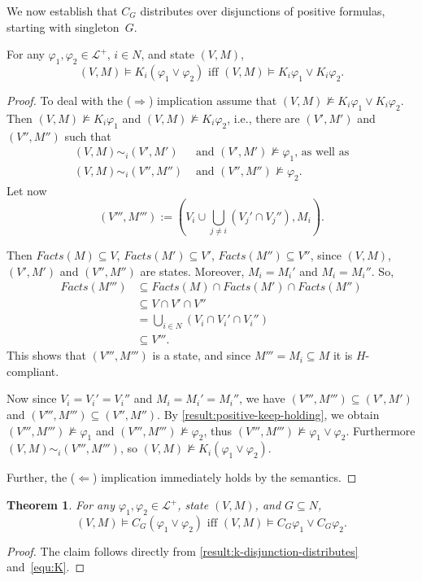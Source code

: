 \documentclass{article}
\newcounter{#1}
\newtheorem{theorem}{Theorem}[section]
\newcommand{\state}[1][]{\ensuremath{(V#1,M#1)}\xspace}
\newcommand{\knows}[1]{\ensuremath{K_{#1}}\xspace}
\newcommand{\ck}[1]{\ensuremath{C_{#1}}\xspace}\newcommand{\Facts}{\mathit{Facts}}
\renewcommand{\enspace}{}
\begin{document}
We now establish that $\ck G$ distributes over disjunctions of positive formulas,
starting with singleton~$G$.
\begin{lemma}
  \label{result:k-disjunction-distributes}
  For any $\varphi_1,\varphi_2\in\mathcal{L}^+$, $i\in N$, and state \state,
\[
\mbox{$\state\vDash \knows i(\varphi_1\vee\varphi_2)$ iff $\state\vDash \knows i\varphi_1\vee \knows i\varphi_2$.}
\]
\end{lemma}
\begin{proof}
  To deal with the ($\Rightarrow$) implication assume that
  $\state\nvDash \knows i\varphi_1\vee \knows i\varphi_2$.  Then
  $\state\nvDash \knows i\varphi_1$ and $\state\nvDash \knows i\varphi_2$,
  i.e., there are $ \state[']$ and $\state['']$ such that
  \begin{align*}
    \state\sim_i \state[']&\text{ and }\state[']\nvDash\varphi_1\enspace\text{, as well as}\\
    \state\sim_i\state['']&\text{ and }\state['']\nvDash\varphi_2\enspace.
  \end{align*}
  Let now \[
  \state[''']:=( V_i\cup\textstyle\bigcup_{j\neq i}(V_j'\cap V_j''),M_i)\enspace.
  \]

  Then $\Facts(M)\subseteq V$, $\Facts(M')\subseteq V'$, $\Facts(M'')\subseteq V''$,
  since \state, \state['] and \state[''] are states.
  Moreover, $M_i=M_i'$ and $M_i=M_i''$.
  So,
  \begin{align*}
    \Facts(M''')&\subseteq\Facts(M)\cap\Facts(M')\cap\Facts(M'')\\
    &\subseteq V\cap V'\cap V''\\
    &=\textstyle\bigcup_{i\in N}(V_i\cap V_i'\cap V_i'')\\
    &\subseteq V'''\enspace.
  \end{align*}
  This shows that \state['''] is a state,
  and since $M'''=M_i\subseteq M$ it is $H$-compliant.

  Now since $V_i=V_i'=V_i''$ and $M_i=M_i'=M_i''$,
  we have $\state[''']\subseteq\state[']$ and $\state[''']\subseteq\state['']$.
  By \cref{result:positive-keep-holding}, we obtain
  $\state[''']\nvDash\varphi_1$
  and
  $\state[''']\nvDash\varphi_2$,
  thus
  $\state[''']\nvDash\varphi_1\vee\varphi_2$.
  Furthermore $\state\sim_i\state[''']$,
  so $\state\nvDash \knows i(\varphi_1\vee\varphi_2)$.

  Further, the ($\Leftarrow$) implication immediately holds by the semantics.  
\end{proof}

\begin{theorem}
  \label{result:ck-disjunction-distributes}
  For any $\varphi_1,\varphi_2\in\mathcal{L}^+$, state \state, and $G\subseteq N$,
\[
\mbox{$\state\vDash \ck G(\varphi_1\vee\varphi_2)$ iff $\state\vDash \ck G\varphi_1\vee \ck G\varphi_2$.}
\]
\end{theorem}
\begin{proof}
The claim follows directly from \cref{result:k-disjunction-distributes} and~\eqref{equ:K}.
\end{proof}
\end{document}
